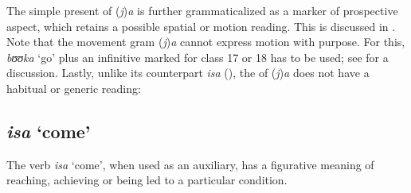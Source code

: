 \largerpage
The simple present of (\textit{j})\textit{a} is further grammaticalized as a marker of prospective aspect, which retains a possible spatial or motion reading. This is discussed in . Note that the movement gram (\textit{j})\textit{a} cannot express motion with purpose. For this, \textit{bʊʊka} \lq go' plus an infinitive marked for  class 17 or 18 has to be used; see  for a discussion. Lastly, unlike its counterpart \textit{isa} (), the  of (\textit{j})\textit{a} does not have a habitual or generic reading:

\begin{exe}
\end{exe}

\subsection{\textit{isa} `come'}\label{isaAspectualizer}
The verb \textit{isa} \lq come', when used as an auxiliary, has a figurative meaning of reaching, achieving or being led to a particular condition.

